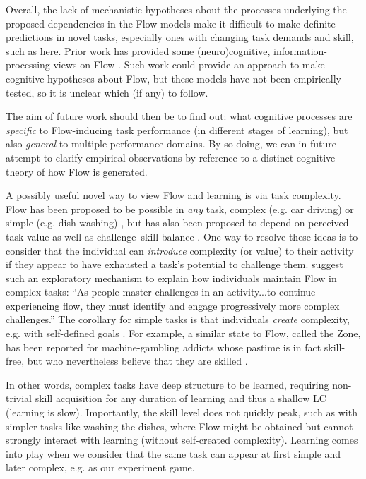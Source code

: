 \documentclass[a4paper,doc,floatsintext,natbib,10pt]{apa6}
\begin{document}
Overall, the lack of mechanistic hypotheses about the processes underlying the proposed dependencies in the Flow models make it difficult to make definite predictions in novel tasks, especially ones with changing task demands and skill, such as here. Prior work has provided some (neuro)cognitive, information-processing views on Flow \citep{Marr2001,Cowley2008,Simlesa2018}. Such work could provide an approach to make cognitive hypotheses about Flow, but these models have not been empirically tested, so it is unclear which (if any) to follow.

The aim of future work should then be to find out: what cognitive processes are {\it specific} to Flow-inducing task performance (in different stages of learning), but also {\it general} to multiple performance-domains. By so doing, we can in future attempt to clarify empirical observations by reference to a distinct cognitive theory of how Flow is generated.

A possibly useful novel way to view Flow and learning is via task complexity. Flow has been proposed to be possible in {\it any} task, complex (e.g. car driving) or simple (e.g. dish washing) \citep{Csikszentmihalyi1999}, but has also been proposed to depend on perceived task value as well as challenge--skill balance \citep{Keller2012}. One way to resolve these ideas is to consider that the individual can {\it introduce} complexity (or value) to their activity if they appear to have exhausted a task's potential to challenge them. \cite{Nakamura2002} suggest such an exploratory mechanism to explain how individuals maintain Flow in complex tasks: ``As people master challenges in an activity...to continue experiencing flow, they must identify and engage progressively more complex challenges.'' The corollary for simple tasks is that individuals {\it create} complexity, e.g. with self-defined goals \citep{Rauterberg1995}. For example, a similar state to Flow, called the Zone, has been reported for machine-gambling addicts whose pastime is in fact skill-free, but who nevertheless believe that they are skilled \citep{Schull2014}.

In other words, complex tasks have deep structure to be learned, requiring non-trivial skill acquisition for any duration of learning and thus a shallow LC (learning is slow). Importantly, the skill level does not quickly peak, such as with simpler tasks like washing the dishes, where Flow might be obtained but cannot strongly interact with learning (without self-created complexity). Learning comes into play when we consider that the same task can appear at first simple and later complex, e.g. as our experiment game.
\end{document}
